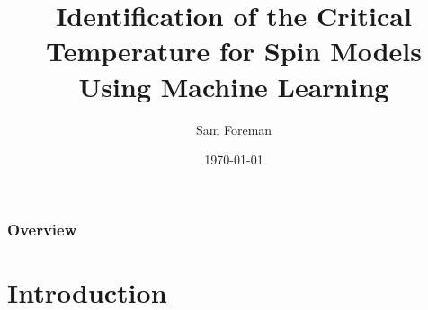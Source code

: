 \documentclass{beamer}
\title[Phase Transitions via ML]{Identification of the Critical Temperature for Spin Models Using
Machine Learning}
\author{Sam Foreman}
\institute[UIowa] %
{University of Iowa\\ %
\medskip
\textit{samuel-foreman@uiowa.edu} %
}
\date{\today} %
\begin{document}
\begin{frame}
\titlepage\end{frame}

\begin{frame}
\frametitle{Overview} %
\tableofcontents %
\end{frame}


\section{Introduction} %
\end{document}
